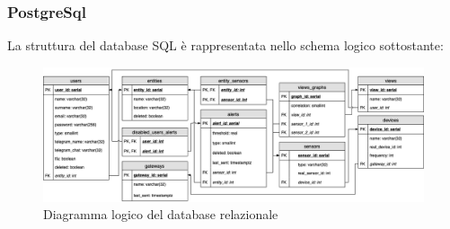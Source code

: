 	\subsubsection{PostgreSql}
	La struttura del database SQL è rappresentata nello schema logico sottostante:
		
			\begin{landscape}
			\begin{figure}[H]
				\centering
				\includegraphics[scale=0.600]{res/images/DATABASE/ER_Modificato.png}
				\caption{Diagramma logico del database relazionale}
				\label{Diagramma 9}
			\end{figure}
			\end{landscape}		
	 